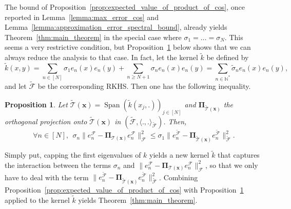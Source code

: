 \documentclass[twoside,11pt]{book}
\newtheorem{proposition}{Proposition}
\numberwithin{theorem}{chapter}
\numberwithin{definition}{chapter}
\numberwithin{proposition}{chapter}
\numberwithin{corollary}{chapter}
\numberwithin{example}{chapter}
\numberwithin{lemma}{chapter}
\numberwithin{assumption}{chapter}
\DeclareMathOperator{\Span}{\mathrm{Span}}
\begin{document}
The bound of Proposition~\ref{prop:expected_value_of_product_of_cos}, once reported in  Lemma~\ref{lemma:max_error_cos} and Lemma~\ref{lemma:approximation_error_spectral_bound}, already yields Theorem~\ref{thm:main_theorem} in the special case where $\sigma_{1} = \dots = \sigma_{N}$. This seems a very restrictive condition, but Proposition~\ref{prop:kernel_perturbation_inequality} below shows that we can always reduce the analysis to that case.
In fact, let the kernel $\tilde{k}$ be defined by
\begin{equation}\label{eq:tilde_k_kernel_definition}
\tilde{k}(x,y) = \sum\limits_{n \in [N]} \sigma_{1}e_{n}(x)e_{n}(y) + \sum\limits_{n \geq N+1} \sigma_{n}e_{n}(x)e_{n}(y) = \sum\limits_{n \in \mathbb{N}^{*}} \tilde{\sigma}_{n}e_{n}(x)e_{n}(y),
\end{equation}
and let $\tilde{\mathcal{F}}$ be the corresponding RKHS. Then one has the following inequality.
\begin{proposition}\label{prop:kernel_perturbation_inequality}
Let $ \tilde{\mathcal{T}}(\bm{x}) = \Span \left( \tilde{k}(x_{j},.) \right)_{j \in [N]}$ and $\bm{\Pi}_{\tilde{\mathcal{T}}(\bm{x})}$ the orthogonal projection onto $\tilde{\mathcal{T}}(\bm{x})$ in $(\tilde{\mathcal{F}}, \langle .,.\rangle_{\tilde{\mathcal{F}}})$. Then,
\begin{equation}\label{eq:kernel_perturbation_inequality}
	\forall n \in [N], \:\: \sigma_{n} \|e_{n}^{\mathcal{F}} - \bm{\Pi}_{\mathcal{T}(\bm{x})} e_{n}^{\mathcal{F}}\|_{\mathcal{F}}^{2} \leq \sigma_{1}   \|e_{n}^{\tilde{\mathcal{F}}} - \bm{\Pi}_{\tilde{\mathcal{T}}(\bm{x})} e_{n}^{\tilde{\mathcal{F}}}\|_{\tilde{\mathcal{F}}}^{2}.
\end{equation}
\end{proposition}
Simply put, capping the first eigenvalues of $k$ yields a new kernel $\tilde{k}$ that captures the interaction between the terms $\sigma_{n}$ and $\|e_{n}^{\mathcal{F}} - \bm{\Pi}_{\mathcal{T}(\bm{x})} e_{n}^{\mathcal{F}}\|_{\mathcal{F}}^{2}$, so that we only have to deal with the term $\|e_{n}^{\tilde{\mathcal{F}}} - \bm{\Pi}_{\tilde{\mathcal{T}}(\bm{x})} e_{n}^{\tilde{\mathcal{F}}}\|_{\tilde{\mathcal{F}}}^{2}$.
Combining  Proposition~\ref{prop:expected_value_of_product_of_cos} with Proposition~\ref{prop:kernel_perturbation_inequality} applied to the kernel $\tilde{k}$ yields Theorem~\ref{thm:main_theorem}. 
\end{document}
